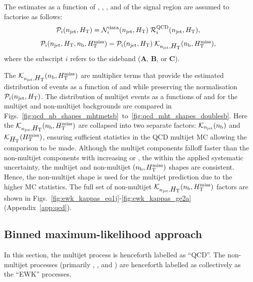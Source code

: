 The estimates as a function of \njet, \scalht, \nb, and \HTmiss of the
signal region are assumed to factorise as follows:
\begin{equation}
  \label{eq:qcd1}
  \mathcal{P}_i( n_{\text{jet}}, \mbox{$H_\text{T}$} )  =
  \mathcal{N}_i^\text{data}( n_{\text{jet}}, \mbox{$H_\text{T}$} )\;
  \mathcal{R}_i^\mathrm{QCD}( n_{\text{jet}}, \mbox{$H_\text{T}$} ),
\end{equation}
\begin{equation}
  \label{eq:qcd2}
  \mathcal{P}_i( n_{\text{jet}}, \mbox{$H_\text{T}$}, n_{\text{b}}, \mbox{$H_{\rm T}^{\rm miss}$} ) = 
  \mathcal{P}_i( n_{\text{jet}}, \mbox{$H_\text{T}$} )\;
  \mathcal{K}_{n_{\text{jet}}, \mbox{$H_\text{T}$}}( n_{\text{b}}, \mbox{$H_{\rm T}^{\rm miss}$} ), 
\end{equation}
where the subscript $i$ refers to the sideband (\textbf{A},
\textbf{B}, or \textbf{C}). 

The $\mathcal{K}_{n_{\text{jet}}, \mbox{$H_\text{T}$}}( n_{\text{b}}, \mbox{$H_{\rm T}^{\rm miss}$} )$ are multiplier
terms that provide the estimated distribution of events as a function
of \nb and \HTmiss while preserving the normalisation $\mathcal{P}_i(
n_{\text{jet}}, \mbox{$H_\text{T}$} )$. The distribution of multijet events as a functions
of \nb and \HTmiss for the multijet and non-multijet backgrounds are compared in
Figs.~\ref{fig:qcd_nb_shapes_mhtmetsb}~to~\ref{fig:qcd_mht_shapes_doublesb}.
Here the $\mathcal{K}_{n_{\text{jet}}, \mbox{$H_\text{T}$}}( n_{\text{b}}, \mbox{$H_{\rm T}^{\rm miss}$} )$ are collapsed into two
separate factors: $\mathcal{K}_{n_{\text{jet}}}(n_{\text{b}})$ and
$\mathcal{K}_{\mbox{$H_\text{T}$}}(\mbox{$H_{\rm T}^{\rm miss}$})$, ensuring sufficient statistics in the QCD
multijet MC allowing the comparison to be made. Although the multijet components
falloff faster than the non-multijet components with increasing \nb or \HTmiss,
the within the applied systematic uncertainty, the multijet and non-multijet
$(n_{\text{b}}, \mbox{$H_{\rm T}^{\rm miss}$})$ shapes are consistent. Hence, the non-multijet shape is used
for the multijet prediction due to the higher MC statistics. The full set of
non-multijet $\mathcal{K}_{n_{\text{jet}}, \mbox{$H_\text{T}$}}( n_{\text{b}}, \mbox{$H_{\rm T}^{\rm miss}$} )$ factors are shown in
Figs.~\ref{fig:ewk_kappas_eq1j}-\ref{fig:ewk_kappas_ge2a}
(Appendix~\ref{app:qcd}).  

\subsection{Binned maximum-likelihood approach}

In this section, the multijet process is henceforth labelled as
``QCD''. The non-multijet processes (primarily \wj, \ttbar, and
\znunu) are henceforth labelled as collectively as the ``EWK''
processes.

